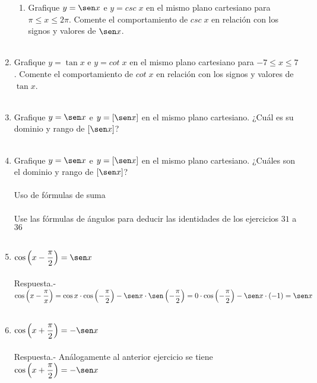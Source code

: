 \begin{enumerate}
\begin{enumerate}[\bfseries a)]
	\item Grafique $y = \sen x$ e $y = csc \; x$ en el mismo plano cartesiano para $\pi \leq x \leq 2\pi$. Comente el comportamiento de $csc\; x$ en relación con los signos y valores de $\sen x$.\\\\
	    
    \end{enumerate}

\item Grafique $y = \tan x$ e $y = cot \; x$ en el mismo plano cartesiano para $-7\leq x \leq 7$. Comente el comportamiento de $cot \; x$ en relación con los signos y valores de $\tan x$.\\\\

\item Grafique $y=\sen x$ e $y=[\sen x]$ en el mismo plano cartesiano. ¿Cuál es su dominio y rango de $[\sen x]$?\\\\

\item Grafique $y=\sen x$ e $y = [\sen x]$ en el mismo plano cartesiano. ¿Cuáles son el dominio y rango de $[\sen x]$?\\\\

Uso de fórmulas de suma\\\\

Use las fórmulas de ángulos para deducir las identidades de los ejercicios $31$ a $36$\\\\

\item $\cos \left(x-\dfrac{\pi}{2}\right) = \sen x$\\\\
    Respuesta.-\; $\cos\left(x-\dfrac{\pi}{x}\right) = \cos x \cdot \cos\left(-\dfrac{\pi}{2}\right)-\sen x \cdot \sen \left(-\dfrac{\pi}{2}\right)=0\cdot \cos\left(-\dfrac{\pi}{2}\right) - \sen x \cdot (-1) = \sen x$\\\\

\item $\cos\left(x + \dfrac{\pi}{2}\right)=-\sen x$\\\\
    Respuesta.-\; Análogamente al anterior ejercicio se tiene $\cos\left(x + \dfrac{\pi}{2}\right)=-\sen x$\\\\


\end{enumerate}
